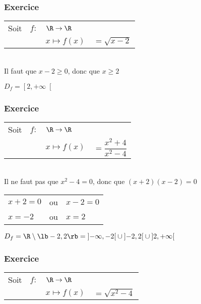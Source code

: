 \subsubsection{Exercice }

\begin{tabular}{llll}

Soit & $f:$& $ \R \rightarrow \R$ & \\
& & $x\mapsto f(x)$ & $=\sqrt{x-2}$ \\
\end{tabular}\\

Il faut que $x-2 \geqslant 0$, donc que $x \geqslant 2 $

$D_f = \left[2, +\infty\right[ $

\newpage

\subsubsection{Exercice }

\begin{tabular}{llll}

Soit & $f:$& $ \R \rightarrow \R$ & \\
& & $x\mapsto f(x)$ & $=\dfrac{x^2 + 4}{x^2 - 4}$ \\
\end{tabular}\\

Il ne faut pas que $x^2 - 4 = 0$, donc que $\left(x+2\right)\left(x-2\right) = 0 $

\begin{tabular}{lll}
$x+2=0$ & ou & $x-2 = 0 $ \\
$x = -2 $ & ou & $x=2$ \\
\end{tabular}

$ D_f = \R \setminus\lb -2,2\rb = \left]-\infty, -2\right[\cup \left]-2,2\right[\cup\left]2, +\infty\right[ $

\subsubsection{Exercice }

\begin{tabular}{llll}

Soit & $f:$& $ \R \rightarrow \R$ & \\
& & $x\mapsto f(x)$ & $=\sqrt{x^2 - 4}$ \\
\end{tabular}

